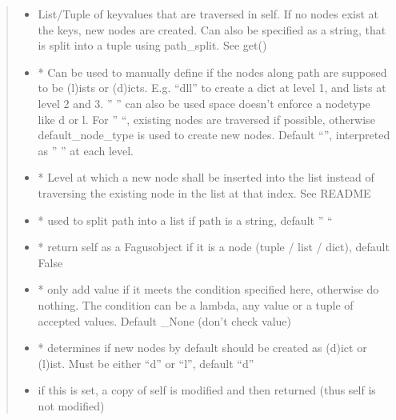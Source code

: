 \documentclass[a4paper,10pt,english]{sphinxmanual}
\begin{document}
\begin{fulllineitems}
\begin{fulllineitems}
\begin{quote}
\begin{description}
\begin{itemize}
\item {}
\sphinxAtStartPar
{} \textendash{} List/Tuple of key\sphinxhyphen{}values that are traversed in self. If no nodes exist at the keys, new nodes are
created. Can also be specified as a string, that is split into a tuple using path\_split. See get()

\item {}
\sphinxAtStartPar
{} \textendash{} * Can be used to manually define if the nodes along path are supposed to be (l)ists or
(d)icts. E.g. “dll” to create a dict at level 1, and lists at level 2 and 3. ” ” can also be used \sphinxhyphen{}
space doesn’t enforce a node\sphinxhyphen{}type like d or l. For ” “, existing nodes are traversed if possible,
otherwise default\_node\_type is used to create new nodes. Default “”, interpreted as ” ” at each level.

\item {}
\sphinxAtStartPar
{} \textendash{} * Level at which a new node shall be inserted into the list instead of traversing the
existing node in the list at that index. See README

\item {}
\sphinxAtStartPar
{} \textendash{} * used to split path into a list if path is a string, default ” “

\item {}
\sphinxAtStartPar
{} \textendash{} * return self as a Fagus\sphinxhyphen{}object if it is a node (tuple / list / dict), default False

\item {}
\sphinxAtStartPar
{} \textendash{} * only add value if it meets the condition specified here, otherwise do nothing. The condition can be
a lambda, any value or a tuple of accepted values. Default \_None (don’t check value)

\item {}
\sphinxAtStartPar
{} \textendash{} * determines if new nodes by default should be created as (d)ict or (l)ist. Must be
either “d” or “l”, default “d”

\item {}
\sphinxAtStartPar
{} \textendash{} if this is set, a copy of self is modified and then returned (thus self is not modified)


\end{itemize}
\end{description}
\end{quote}
\end{fulllineitems}
\end{fulllineitems}
\end{document}
